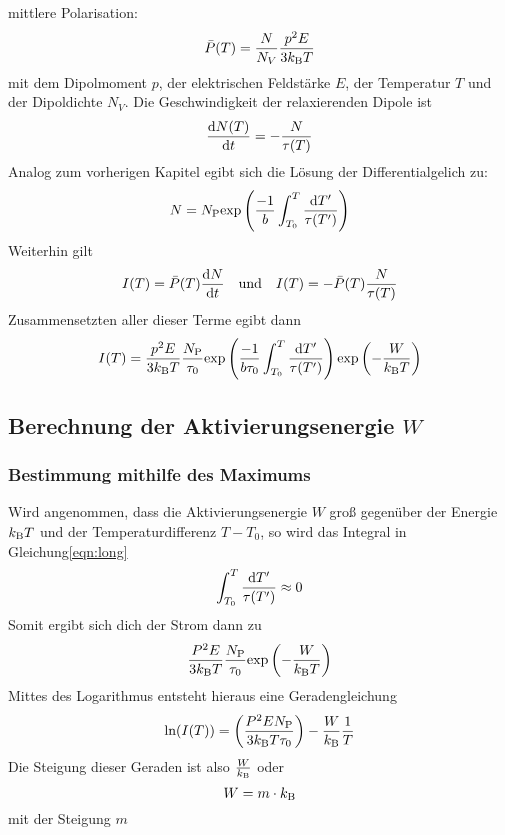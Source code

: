 		mittlere Polarisation:
		\begin{equation}
			\bar{P}(T) = \frac{N}{N_V}\frac{p^2E}{3k_{\text{B}}T}
		\end{equation}	
		mit dem Dipolmoment $p$, der elektrischen Feldstärke $E$, der Temperatur $T$ und der Dipoldichte $N_V$.
		Die Geschwindigkeit der relaxierenden Dipole ist
		\begin{equation}
			\frac{\text{d} N(T)}{\text{d} t} =- \frac{N}{\tau(T)}
		\end{equation}
		Analog zum vorherigen Kapitel egibt sich die Lösung der Differentialgelich zu:
		\begin{equation}
			N = N_{\text{P}} \text{exp}\left( \frac{-1}{b}\int_{T_0}^T \frac{\text{d}T'}{\tau(T')}\right)
		\end{equation}
		Weiterhin gilt
		\begin{align}
			I(T) = \bar{P}(T)\frac{\text{d} N}{\text{d} t}& &\text{und} & & I(T) = -\bar{P}(T) \frac{N}{\tau(T)}
		\end{align}
		Zusammensetzten aller dieser Terme egibt dann
		\begin{equation}
			I(T) =\frac{p^2E}{3k_{\text{B}}T}\frac{N_{\text{P}}}{\tau_0}\text{exp}\left(\frac{-1}{b\tau_0}\int_{T_0}^T\frac{\text{d}T'}{\tau(T')}\right)\text{exp}\left(-\frac{W}{k_{\text{B}}T}\right)
			\label{eqn:long}
		\end{equation}		

	\subsection{Berechnung der Aktivierungsenergie $W$}
		
		\subsubsection{Bestimmung mithilfe des Maximums}

				Wird angenommen, dass die Aktivierungsenergie $W$ groß gegenüber der Energie $k_{\text{B}}T$ und der Temperaturdifferenz $T-T_0$, so wird das Integral in Gleichung\ref{eqn:long} 
				\begin{equation}
					\int_{T_0}^T\frac{\text{d}T'}{\tau(T')} \approx 0
				\end{equation}
				Somit ergibt sich dich der Strom dann zu
				\begin{equation}
					\frac{P^2E}{3k_{\text{B}}T}\frac{N_{\text{P}}}{\tau_0} \text{exp}\left(-\frac{W}{k_{\text{B}}T}\right)
				\end{equation}	
				Mittes des Logarithmus entsteht hieraus eine Geradengleichung
				\begin{equation}
					\text{ln}(I(T)) = \left(\frac{P^2EN_{\text{P}}}{3k_{\text{B}}T\tau_0}\right) - \frac{W}{k_{\text{B}}} \frac{1}{T}
				\end{equation}
				Die Steigung dieser Geraden ist also $\frac{W}{k_{\text{B}}}$ oder
				\begin{equation}
					W = m \cdot k_{\text{B}}
				\end{equation}
				mit der Steigung $m$
